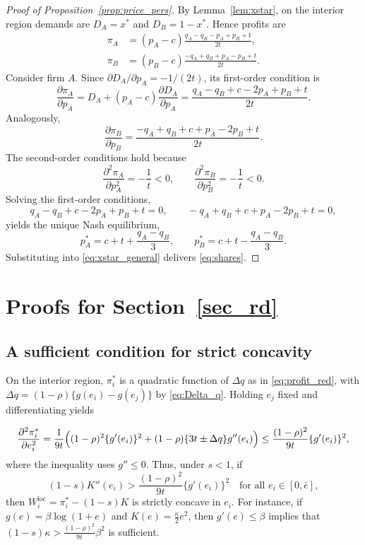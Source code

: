 \begin{proof}[Proof of Proposition~\ref{prop:price_pers}]
\label{app:proof-price-pers}
By Lemma~\ref{lem:xstar}, on the interior region demands are $D_A=x^*$ and $D_B=1-x^*$. Hence profits are
\[
\begin{aligned}
\pi_A&=(p_A-c)\frac{q_A-q_B-p_A+p_B+t}{2t},\\
\pi_B&=(p_B-c)\frac{-q_A+q_B+p_A-p_B+t}{2t}.
\end{aligned}
\]
Consider firm $A$. Since $\partial D_A/\partial p_A=-1/(2t)$, its first-order condition is
\[
\frac{\partial \pi_A}{\partial p_A}
= D_A + (p_A-c)\frac{\partial D_A}{\partial p_A}
=\frac{q_A-q_B+c-2p_A+p_B+t}{2t}.
\]
Analogously,
\[
\frac{\partial \pi_B}{\partial p_B}
=\frac{-q_A+q_B+c+p_A-2p_B+t}{2t}.
\]
The second-order conditions hold because
\[
\frac{\partial^2 \pi_A}{\partial p_A^2}=-\frac{1}{t}<0,\qquad
\frac{\partial^2 \pi_B}{\partial p_B^2}=-\frac{1}{t}<0.
\]
Solving the first-order conditions,
\[
q_A-q_B+c-2p_A+p_B+t=0,\qquad
-q_A+q_B+c+p_A-2p_B+t=0,
\]
yields the unique Nash equilibrium,
\[
p_A^*=c+t+\frac{q_A-q_B}{3},\qquad
p_B^*=c+t-\frac{q_A-q_B}{3}.
\]
Substituting into \eqref{eq:xstar_general} delivers \eqref{eq:shares}.
\end{proof}




\section{Proofs for Section~\ref{sec_rd}}
\label{app:rd}


\renewcommand{\thesubsection}{\Alph{section}}

\renewcommand{\thesubsection}{\Alph{section}}






\subsection*{A sufficient condition for strict concavity}
\label{app:concavity}
On the interior region, $\pi_i^*$ is a quadratic function of $\Delta q$ as in \eqref{eq:profit_red}, with $\Delta q=(1-\rho)\{g(e_i)-g(e_j)\}$ by \eqref{eq:Delta_q}. Holding $e_j$ fixed and differentiating yields

\[
\frac{\partial^2 \pi_i^*}{\partial e_i^2}
=\frac{1}{9t}\Bigl((1-\rho)^2\{g'(e_i)\}^2+(1-\rho)\{3t\pm \Delta q\}g''(e_i)\Bigr)
\le \frac{(1-\rho)^2}{9t}\{g'(e_i)\}^2,
\]
where the inequality uses $g''\le 0$. Thus, under $s<1$, if
\[
(1-s)K''(e_i)>\frac{(1-\rho)^2}{9t}\{g'(e_i)\}^2 \quad \text{for all }e_i\in[0,\bar e],
\]
then $W_i^{\mathrm{loc}}=\pi_i^*-(1-s)K$ is strictly concave in $e_i$. For instance, if $g(e)=\beta\log(1+e)$ and $K(e)=\frac{\kappa}{2}e^2$, then $g'(e)\le \beta$ implies that $(1-s)\kappa>\frac{(1-\rho)^2}{9t}\beta^2$ is sufficient.

